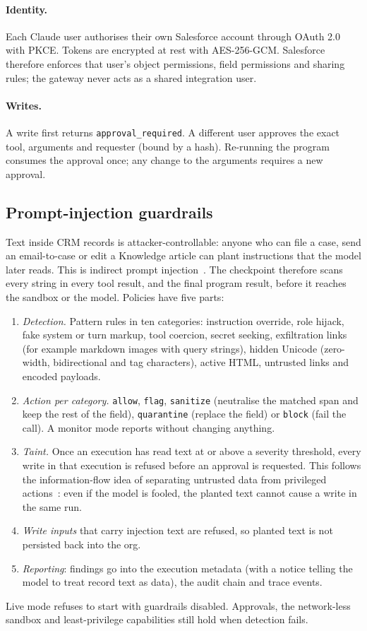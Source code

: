 \documentclass[11pt]{article}
\begin{document}
\paragraph{Identity.} Each Claude user authorises their own Salesforce account through OAuth 2.0 with PKCE. Tokens are encrypted at rest with AES-256-GCM. Salesforce therefore enforces that user's object permissions, field permissions and sharing rules; the gateway never acts as a shared integration user.
\paragraph{Writes.} A write first returns \texttt{approval\_required}. A different user approves the exact tool, arguments and requester (bound by a hash). Re-running the program consumes the approval once; any change to the arguments requires a new approval.

\subsection{Prompt-injection guardrails}\label{sec:guard}
Text inside CRM records is attacker-controllable: anyone who can file a case, send an email-to-case or edit a Knowledge article can plant instructions that the model later reads. This is indirect prompt injection~\cite{greshake,owasp}. The checkpoint therefore scans every string in every tool result, and the final program result, before it reaches the sandbox or the model. Policies have five parts:
\begin{enumerate}
\item \emph{Detection.} Pattern rules in ten categories: instruction override, role hijack, fake system or turn markup, tool coercion, secret seeking, exfiltration links (for example markdown images with query strings), hidden Unicode (zero-width, bidirectional and tag characters), active HTML, untrusted links and encoded payloads.
\item \emph{Action per category.} \texttt{allow}, \texttt{flag}, \texttt{sanitize} (neutralise the matched span and keep the rest of the field), \texttt{quarantine} (replace the field) or \texttt{block} (fail the call). A monitor mode reports without changing anything.
\item \emph{Taint.} Once an execution has read text at or above a severity threshold, every write in that execution is refused before an approval is requested. This follows the information-flow idea of separating untrusted data from privileged actions~\cite{camel}: even if the model is fooled, the planted text cannot cause a write in the same run.
\item \emph{Write inputs} that carry injection text are refused, so planted text is not persisted back into the org.
\item \emph{Reporting}: findings go into the execution metadata (with a notice telling the model to treat record text as data), the audit chain and trace events.
\end{enumerate}
Live mode refuses to start with guardrails disabled. Approvals, the network-less sandbox and least-privilege capabilities still hold when detection fails.
\end{document}
